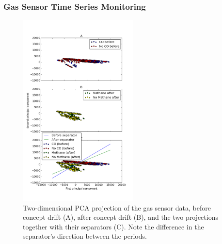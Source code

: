 \documentclass[11pt,twocolumn,varwidth=true,a4paper,fleqn]{article}
\begin{document}


\subsubsection{Gas Sensor Time Series Monitoring} 

\begin{figure}[h!]
\centering
\includegraphics[width=60mm]{BigGas/showData.png}
\caption{Two-dimensional PCA projection of the gas sensor data, 
before concept drift (A), after concept drift (B), 
and the two projections together with their separators (C). 
Note the difference in the separator's
direction between the periods.}
\label{BigGasShowData}
\end{figure}
\end{document}
